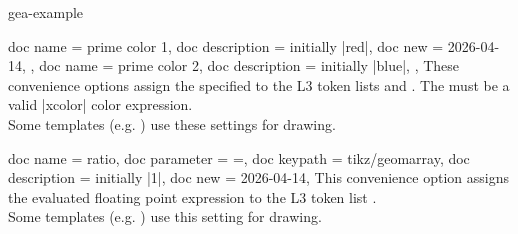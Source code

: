 \documentclass[a4paper,11pt]{article}
\begin{document}
\begin{docKeys}
\begin{dispExample*}{gea-example}
\end{dispExample*}
\end{docKeys}


\begin{docKeys}
  [
      doc parameter   = {=\meta{color}},
      doc keypath     = tikz/geomarray,
  ]
  {
    {
      doc name        = prime color 1,
      doc description = {initially |red|},
      doc new         = {2026-04-14},
    },
    {
      doc name        = prime color 2,
      doc description = {initially |blue|},
    },
  }
  These convenience options assign the specified  to the L3 token
  lists  and
  . The  must be a valid
  |xcolor| color expression.\\
  Some templates (e.g. )
  use these settings for drawing.
\end{docKeys}



\begin{docKeys}
  {
    {
      doc name        = ratio,
      doc parameter   = {=},
      doc keypath     = tikz/geomarray,
      doc description = {initially |1|},
      doc new         = {2026-04-14},
    }
  }
  This convenience option assigns the evaluated floating point expression  to the L3 token
  list .\\
  Some templates (e.g. )
  use this setting for drawing.
\end{docKeys}
\end{document}
